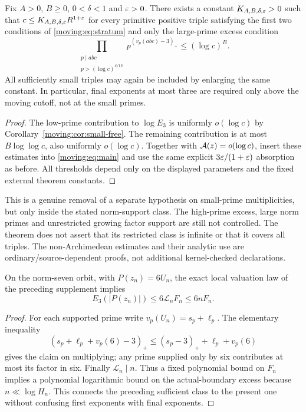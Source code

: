 \begin{theorem}\label{moving:thm:large-prime-stratum}
Fix $A>0$, $B\ge0$, $0<\delta<1$ and $\varepsilon>0$. There exists a constant $K_{A,B,\delta,\varepsilon}>0$ such that $c\le K_{A,B,\delta,\varepsilon}R^{1+\varepsilon}$ for every primitive positive triple satisfying the first two conditions of \eqref{moving:eq:stratum} and only the large-prime excess condition
\[
 \prod_{\substack{p\mid abc\\p>(\log c)^{\delta/12}}}
        p^{(v_p(abc)-3)_+}\le(\log c)^B.
\]
All sufficiently small triples may again be included by enlarging the same constant. In particular, final exponents at most three are required only above the moving cutoff, not at the small primes.
\end{theorem}
\begin{proof}
The low-prime contribution to $\log E_3$ is uniformly $o(\log c)$ by Corollary~\ref{moving:cor:small-free}. The remaining contribution is at most $B\log\log c$, also uniformly $o(\log c)$. Together with $\mathcal A(z)=o(\log c)$, insert these estimates into \eqref{moving:eq:main} and use the same explicit $3\varepsilon/(1+\varepsilon)$ absorption as before. All thresholds depend only on the displayed parameters and the fixed external theorem constants.
\end{proof}

This is a genuine removal of a separate hypothesis on small-prime multiplicities, but only inside the stated norm-support class. The high-prime excess, large norm primes and unrestricted growing factor support are still not controlled. The theorem does not assert that its restricted class is infinite or that it covers all triples. The non-Archimedean estimates and their analytic use are ordinary/source-dependent proofs, not additional kernel-checked declarations.


\begin{proposition}\label{moving:prop:first-to-final}
On the norm-seven orbit, with $P(z_n)=6U_n$, the exact local valuation law of the preceding supplement implies
\[
 E_3(|P(z_n)|)\le6\mathcal L_n F_n\le6nF_n.
\]
\end{proposition}
\begin{proof}
For each supported prime write $v_p(U_n)=s_p+\ell_p$. The elementary inequality
\[
 (s_p+\ell_p+v_p(6)-3)_+\le(s_p-3)_++\ell_p+v_p(6)
\]
gives the claim on multiplying; any prime supplied only by six contributes at most its factor in six. Finally $\mathcal L_n\mid n$. Thus a fixed polynomial bound on $F_n$ implies a polynomial logarithmic bound on the actual-boundary excess because $n\ll\log H_n$. This connects the preceding sufficient class to the present one without confusing first exponents with final exponents.
\end{proof}

